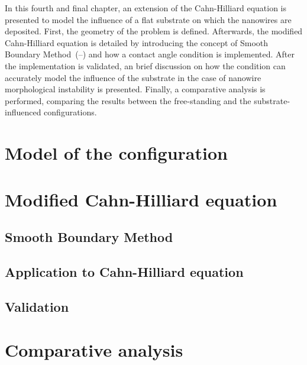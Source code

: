 In this fourth and final chapter, an extension of the Cahn-Hilliard equation is presented to model the influence of a flat substrate on which the nanowires are deposited. First, the geometry of the problem is defined. Afterwards, the modified Cahn-Hilliard equation is detailed by introducing the concept of Smooth Boundary Method (\cite{YuChenThornton2009}\nocite{YuChenThornton2012}\nocite{SinhababuBhattacharya2022}\nocite{YangWangKim2022}--\cite{LiChoiKim2016}) and how a contact angle condition is implemented. After the implementation is validated, an brief discussion on how the condition can accurately model the influence of the substrate in the case of nanowire morphological instability is presented. Finally, a comparative analysis is performed, comparing the results between the free-standing and the substrate-influenced configurations. 
\section{Model of the configuration}
\section{Modified Cahn-Hilliard equation}
    \subsection{Smooth Boundary Method}
    \subsection{Application to Cahn-Hilliard equation}
    \subsection{Validation}
\section{Comparative analysis}
